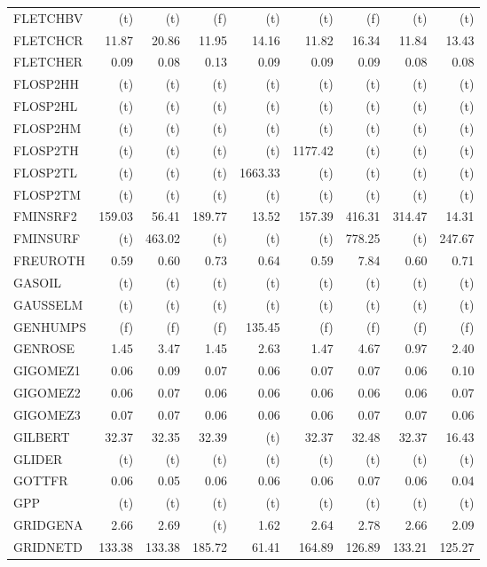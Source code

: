 \documentclass[11pt,twoside]{article}
\begin{document}
{\begin{longtable}[c]{|l|r|r|r|r|r|r|r|r|}
FLETCHBV & (t) & (t) & (f) & (t) & (t) & (f) & (t) & (t) \\
FLETCHCR & 11.87 & 20.86 & 11.95 & 14.16 & 11.82 & 16.34 & 11.84 & 13.43 \\
FLETCHER & 0.09 & 0.08 & 0.13 & 0.09 & 0.09 & 0.09 & 0.08 & 0.08 \\
FLOSP2HH & (t) & (t) & (t) & (t) & (t) & (t) & (t) & (t) \\
FLOSP2HL & (t) & (t) & (t) & (t) & (t) & (t) & (t) & (t) \\
FLOSP2HM & (t) & (t) & (t) & (t) & (t) & (t) & (t) & (t) \\
FLOSP2TH & (t) & (t) & (t) & (t) & 1177.42 & (t) & (t) & (t) \\
FLOSP2TL & (t) & (t) & (t) & 1663.33 & (t) & (t) & (t) & (t) \\
FLOSP2TM & (t) & (t) & (t) & (t) & (t) & (t) & (t) & (t) \\
FMINSRF2 & 159.03 & 56.41 & 189.77 & 13.52 & 157.39 & 416.31 & 314.47 & 14.31 \\
FMINSURF & (t) & 463.02 & (t) & (t) & (t) & 778.25 & (t) & 247.67 \\
FREUROTH & 0.59 & 0.60 & 0.73 & 0.64 & 0.59 & 7.84 & 0.60 & 0.71 \\
GASOIL & (t) & (t) & (t) & (t) & (t) & (t) & (t) & (t) \\
GAUSSELM & (t) & (t) & (t) & (t) & (t) & (t) & (t) & (t) \\
GENHUMPS & (f) & (f) & (f) & 135.45 & (f) & (f) & (f) & (f) \\
GENROSE & 1.45 & 3.47 & 1.45 & 2.63 & 1.47 & 4.67 & 0.97 & 2.40 \\
GIGOMEZ1 & 0.06 & 0.09 & 0.07 & 0.06 & 0.07 & 0.07 & 0.06 & 0.10 \\
GIGOMEZ2 & 0.06 & 0.07 & 0.06 & 0.06 & 0.06 & 0.06 & 0.06 & 0.07 \\
GIGOMEZ3 & 0.07 & 0.07 & 0.06 & 0.06 & 0.06 & 0.07 & 0.07 & 0.06 \\
GILBERT & 32.37 & 32.35 & 32.39 & (t) & 32.37 & 32.48 & 32.37 & 16.43 \\
GLIDER & (t) & (t) & (t) & (t) & (t) & (t) & (t) & (t) \\
GOTTFR & 0.06 & 0.05 & 0.06 & 0.06 & 0.06 & 0.07 & 0.06 & 0.04 \\
GPP & (t) & (t) & (t) & (t) & (t) & (t) & (t) & (t) \\
GRIDGENA & 2.66 & 2.69 & (t) & 1.62 & 2.64 & 2.78 & 2.66 & 2.09 \\
GRIDNETD & 133.38 & 133.38 & 185.72 & 61.41 & 164.89 & 126.89 & 133.21 & 125.27 \\

\end{longtable}}
\end{document}
